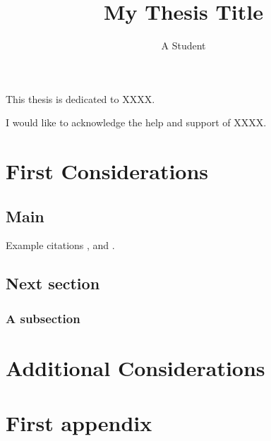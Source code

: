 \documentclass{ncfthesis}                             %
\title{My Thesis Title}
\author{A Student}
\begin{document}
\frontmatter

\maketitle

\begin{dedication}
This thesis is dedicated to XXXX.
\end{dedication}

\begin{acknowledgements}
I would like to acknowledge the help and support of XXXX.
\end{acknowledgements}

\tableofcontents

\begin{abstract}
\kant[1] %
\end{abstract}


\mainmatter


\chapter{First Considerations}
\section{Main}
\kant[2-4]
Example citations \cite{hitchin1987}, \cite{jaffe1980} and \cite{joyce2012}.
\section{Next section}
\kant[5-6]
\subsection{A subsection}
\kant[7]

\chapter{Additional Considerations}
\kant[8-10]

\appendix
\chapter{First appendix}

\end{document}
